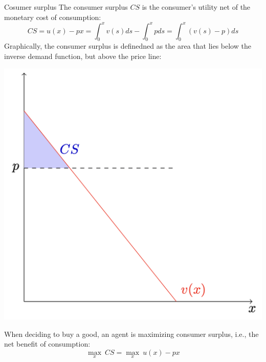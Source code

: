 \begin{theo}{Cosumer surplus}
    The consumer surplus $CS$ is the consumer's utility net of the monetary cost of consumption:
    \begin{equation*}
        CS = u(x) - px = \int_0^x v(s)ds - \int_0^x pds = \int_0^x \left(v(s) - p \right)ds
    \end{equation*}
    Graphically, the consumer surplus is definedned as the area that lies below the inverse demand function, but above the price line:
    \begin{center}
        \includegraphics[scale = 0.15]{Images/Demand/ConsumerSurplus.png}
    \end{center}
    When deciding to buy a good, an agent is maximizing consumer surplus, i.e., the net benefit of consumption:
    \begin{equation*}
        \max_x \ CS = \max_x \ u(x) - px
    \end{equation*}
\end{theo}